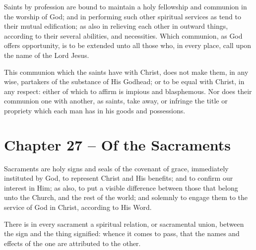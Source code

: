 \begin{outerlst}[left=0pt,labelsep=0pt]
\begin{innerlst}[resume*]
\item Saints by profession are bound to maintain a holy fellowship and communion in the worship of God; and in performing such other spiritual services as tend to their mutual edification; as also in relieving each other in outward things, according to their several abilities, and necessities. Which communion, as God offers opportunity, is to be extended unto all those who, in every place, call upon the name of the Lord Jesus.   

\item This communion which the saints have with Christ, does not make them, in any wise, partakers of the substance of His Godhead; or to be equal with Christ, in any respect: either of which to affirm is impious and blasphemous. Nor does their communion one with another, as saints, take away, or infringe the title or propriety which each man has in his goods and possessions.  
\end{innerlst}

\item
{}
\section{Chapter 27 -- Of the Sacraments}
\begin{innerlst}[resume*]

\item Sacraments are holy signs and seals of the covenant of grace, immediately instituted by God, to represent Christ and His benefits; and to confirm our interest in Him; as also, to put a visible difference between those that belong unto the Church, and the rest of the world; and solemnly to engage them to the service of God in Christ, according to His Word.   

\item There is in every sacrament a spiritual relation, or sacramental union, between the sign and the thing signified: whence it comes to pass, that the names and effects of the one are attributed to the other.   


\end{innerlst}
\end{outerlst}
